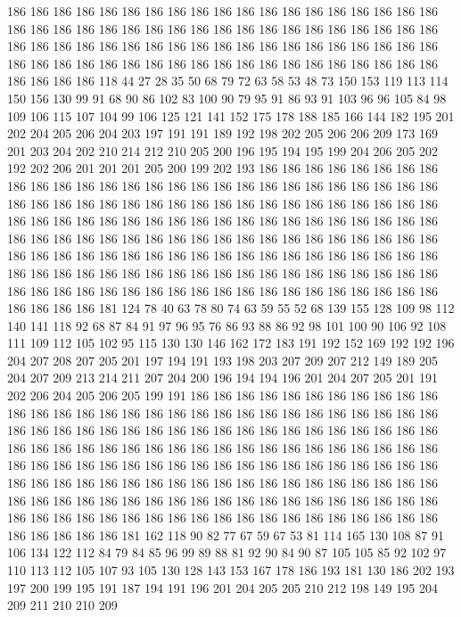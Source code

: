 186 186 186 186 186 186 186 186 186 186 186 186 186 186 186 186 186 186 186 186
186 186 186 186 186 186 186 186 186 186 186 186 186 186 186 186 186 186 186 186
186 186 186 186 186 186 186 186 186 186 186 186 186 186 186 186 186 186 186 186
186 186 186 186 186 186 186 186 186 186 186 186 186 186 186 186 186 186 186 186
118 44 27 28 35 50 68 79 72 63 58 53 48 73 150 153 119 113 114 150
156 130 99 91 68 90 86 102 83 100 90 79 95 91 86 93 91 103 96 96
105 84 98 109 106 115 107 104 99 106 125 121 141 152 175 178 188 185 166 144
182 195 201 202 204 205 206 204 203 197 191 191 189 192 198 202 205 206 206 209
173 169 201 203 204 202 210 214 212 210 205 200 196 195 194 195 199 204 206 205
202 192 202 206 201 201 201 205 200 199 202 193 186 186 186 186 186 186 186 186
186 186 186 186 186 186 186 186 186 186 186 186 186 186 186 186 186 186 186 186
186 186 186 186 186 186 186 186 186 186 186 186 186 186 186 186 186 186 186 186
186 186 186 186 186 186 186 186 186 186 186 186 186 186 186 186 186 186 186 186
186 186 186 186 186 186 186 186 186 186 186 186 186 186 186 186 186 186 186 186
186 186 186 186 186 186 186 186 186 186 186 186 186 186 186 186 186 186 186 186
186 186 186 186 186 186 186 186 186 186 186 186 186 186 186 186 186 186 186 186
186 186 186 186 186 186 186 186 186 186 186 186 186 186 186 186 186 181 124 78
40 63 78 80 74 63 59 55 52 68 139 155 128 109 98 112 140 141 118 92
68 87 84 91 97 96 95 76 86 93 88 86 92 98 101 100 90 106 92 108
111 109 112 105 102 95 115 130 130 146 162 172 183 191 192 152 169 192 192 196
204 207 208 207 205 201 197 194 191 193 198 203 207 209 207 212 149 189 205 204
207 209 213 214 211 207 204 200 196 194 194 196 201 204 207 205 201 191 202 206
204 205 206 205 199 191 186 186 186 186 186 186 186 186 186 186 186 186 186 186
186 186 186 186 186 186 186 186 186 186 186 186 186 186 186 186 186 186 186 186
186 186 186 186 186 186 186 186 186 186 186 186 186 186 186 186 186 186 186 186
186 186 186 186 186 186 186 186 186 186 186 186 186 186 186 186 186 186 186 186
186 186 186 186 186 186 186 186 186 186 186 186 186 186 186 186 186 186 186 186
186 186 186 186 186 186 186 186 186 186 186 186 186 186 186 186 186 186 186 186
186 186 186 186 186 186 186 186 186 186 186 186 186 186 186 186 186 186 186 186
186 186 186 186 186 186 186 186 186 186 186 186 186 186 186 181 162 118 90 82
77 67 59 67 53 81 114 165 130 108 87 91 106 134 122 112 84 79 84 85
96 99 89 88 81 92 90 84 90 87 105 105 85 92 102 97 110 113 112 105
107 93 105 130 128 143 153 167 178 186 193 181 130 186 202 193 197 200 199 195
191 187 194 191 196 201 204 205 205 210 212 198 149 195 204 209 211 210 210 209
